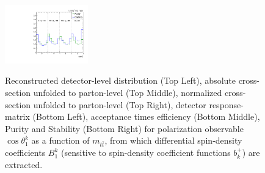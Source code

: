 \begin{figure}[htb]
\begin{center}
 \includegraphics[width=0.32\textwidth]{fig_fullRun2UL/unfolding/combined/PurStab_b1k_mttbar.pdf} \\
\caption{Reconstructed detector-level distribution (Top Left), absolute cross-section unfolded to parton-level (Top Middle), normalized cross-section unfolded to parton-level (Top Right), detector response-matrix (Bottom Left), acceptance times efficiency (Bottom Middle), Purity and Stability (Bottom Right) for polarization observable $\cos\theta_{1}^{k}$ as a function of $m_{t\bar{t}}$, from which differential spin-density coefficients $B_{1}^{k}$ (sensitive to spin-density coefficient functions $b_k^{+}$) are extracted.}
\label{fig:b1k_mttbar}
\end{center}
\end{figure}
\clearpage
